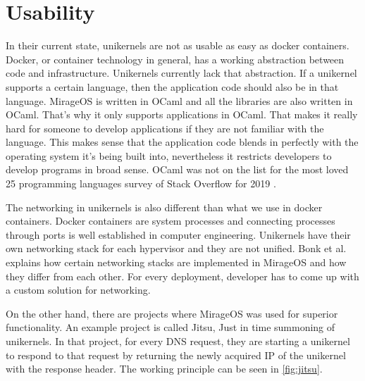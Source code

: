 \section{Usability}
In their current state, unikernels are not as usable as easy as docker containers. Docker, or container technology in general, has a working abstraction between code and infrastructure. Unikernels currently lack that abstraction. If a unikernel supports a certain language, then the application code should also be in that language. MirageOS is written in OCaml and all the libraries are also written in OCaml. That's why it only supports applications in OCaml. That makes it really hard for someone to develop applications if they are not familiar with the language. This makes sense that the application code blends in perfectly with the operating system it's being built into, nevertheless it restricts developers to develop programs in broad sense. OCaml was not on the list for the most loved 25 programming languages survey of Stack Overflow for 2019 \cite{2019-survey}.

The networking in unikernels is also different than what we use in docker containers. Docker containers are system processes and connecting processes through ports is well established in computer engineering. Unikernels have their own networking stack for each hypervisor and they are not unified. Bonk et al. \cite{Bonk} explains how certain networking stacks are implemented in MirageOS and how they differ from each other. For every deployment, developer has to come up with a custom solution for networking.

On the other hand, there are projects where MirageOS was used for superior functionality. An example project is called Jitsu\cite{jitsu}, Just in time summoning of unikernels. In that project, for every DNS request, they are starting a unikernel to respond to that request by returning the newly acquired IP of the unikernel with the response header. The working principle can be seen in \ref{fig:jitsu}.

